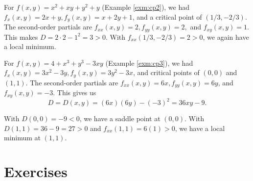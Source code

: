\documentclass[
]{book}
\theoremstyle{definition}
\theoremstyle{definition}
\theoremstyle{definition}
\theoremstyle{definition}
\theoremstyle{remark}
\begin{document}
For \(f(x,y)=x^2+xy+y^2+y\) (Example \ref{exm:cp2}), we had \(f_x(x,y)=2x+y, f_y(x,y)=x+2y+1\), and a critical point of \((1/3,-2/3)\). The second-order partials are
\(f_{xx}(x,y)=2, f_{yy}(x,y)=2,\) and \(f_{xy}(x,y)=1.\) This makes \(D=2\cdot 2-1^2=3>0\). With \(f_{xx}(1/3,-2/3)=2>0\), we again have a local minimum.

For \(f(x,y)=4+x^3+y^3-3xy\) (Example \ref{exm:cp3}), we had \(f_x(x,y)=3x^2-3y,f_y(x,y)=3y^2-3x\), and critical points of \((0,0)\) and \((1,1)\). The second-order partials are \(f_{xx}(x,y)=6x, f_{yy}(x,y)=6y\), and \(f_{xy}(x,y)=-3.\) This gives us
\[D=D(x,y)=(6x)(6y)-(-3)^2=36xy-9.\]

With \(D(0,0)=-9<0\), we have a saddle point at \((0,0)\). With \(D(1,1)=36-9=27>0\) and \(f_{xx}(1,1)=6(1)>0\), we have a local minimum at \((1,1)\).

\section{Exercises}\label{exercises-7}
\end{document}
